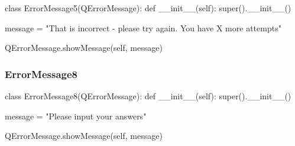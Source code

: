 \begin{landscape}
\begin{python}
class ErrorMessage5(QErrorMessage):
    def __init__(self):
        super().__init__()
        
        message = "That is incorrect - please try again. You have X more attempts"
        
        QErrorMessage.showMessage(self, message)
\end{python}

\subsubsection{ErrorMessage8}

\begin{python}
class ErrorMessage8(QErrorMessage):
    def __init__(self):
        super().__init__()
        
        message = "Please input your answers"
        
        QErrorMessage.showMessage(self, message)
\end{python}

\end{landscape}
